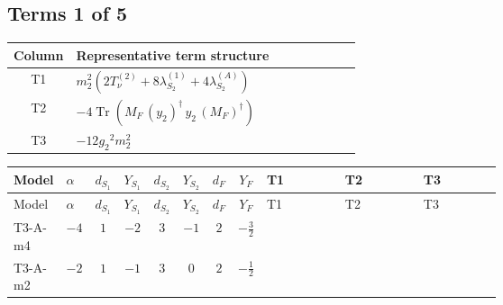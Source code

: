 \documentclass[8pt]{article}
\begin{document}
\begin{landscape}
\subsection*{Terms 1 of 5}
\begin{center}
\begin{tabular}{@{}c >{\raggedright\arraybackslash}p{0.82\linewidth}@{}}
\toprule
Column & Representative term structure \\
\midrule
T1 & \(\displaystyle {m_2^2} (2 T_{\nu}^{(2)}+8 {\lambda_{S_2}^{(1)}}+4 {\lambda_{S_2}^{(A)}})\) \\
\midrule
T2 & \(\displaystyle -4 \operatorname{Tr}\!\left({M_F}\,\left({y_2}\right)^{\dagger}\,{y_2}\,\left({M_F}\right)^{\dagger}\right)\) \\
\midrule
T3 & \(\displaystyle -12 {g_2}^2 {m_2^2}\) \\
\midrule
\bottomrule
\end{tabular}
\end{center}
\smallskip
\tiny
\begin{longtable}{@{}llcccccc >{\raggedright\arraybackslash}p{0.21\linewidth} >{\raggedright\arraybackslash}p{0.21\linewidth} >{\raggedright\arraybackslash}p{0.21\linewidth}@{}}
\toprule
Model & $\alpha$ & $d_{S_1}$ & $Y_{S_1}$ & $d_{S_2}$ & $Y_{S_2}$ & $d_F$ & $Y_F$ & T1 & T2 & T3 \\
\midrule
\endfirsthead
\toprule
Model & $\alpha$ & $d_{S_1}$ & $Y_{S_1}$ & $d_{S_2}$ & $Y_{S_2}$ & $d_F$ & $Y_F$ & T1 & T2 & T3 \\
\midrule
\endhead
T3-A-m4 & $-4$ & $1$ & $-2$ & $3$ & $-1$ & $2$ & $-\frac{3}{2}$ & \scriptsize\adjustbox{max width=\linewidth}{$\begin{gathered} {m_2^2} (2 T_{\nu}^{(2)}+8 {\lambda_{S_2}^{(1)}}+4 {\lambda_{S_2}^{(A)}})\end{gathered}$} & \scriptsize\adjustbox{max width=\linewidth}{$\begin{gathered} -4 \operatorname{Tr}\!\left({M_F}\,\left({y_2}\right)^{\dagger}\,{y_2}\,\left({M_F}\right)^{\dagger}\right)\end{gathered}$} & \scriptsize\adjustbox{max width=\linewidth}{$\begin{gathered} -12 {g_2}^2 {m_2^2}\end{gathered}$} \\
\midrule
T3-A-m2 & $-2$ & $1$ & $-1$ & $3$ & $0$ & $2$ & $-\frac{1}{2}$ & \scriptsize\adjustbox{max width=\linewidth}{$\begin{gathered} {m_2^2} (2 T_{\nu}^{(2)}+8 {\lambda_{S_2}^{(1)}}+4 {\lambda_{S_2}^{(A)}})\end{gathered}$} & \scriptsize\adjustbox{max width=\linewidth}{$\begin{gathered} -4 \operatorname{Tr}\!\left({M_F}\,\left({y_2}\right)^{\dagger}\,{y_2}\,\left({M_F}\right)^{\dagger}\right)\end{gathered}$} & \scriptsize\adjustbox{max width=\linewidth}{$\begin{gathered} -12 {g_2}^2 {m_2^2}\end{gathered}$} \\

\end{longtable}
\end{landscape}
\end{document}
